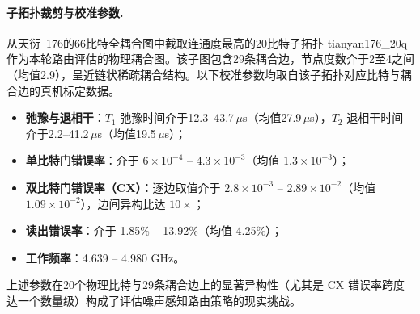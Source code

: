 \paragraph{子拓扑裁剪与校准参数.}
从天衍~176的66比特全耦合图中截取连通度最高的20比特子拓扑 tianyan176\_20q 作为本轮路由评估的物理耦合图。该子图包含29条耦合边，节点度数介于2至4之间（均值2.9），呈近链状稀疏耦合结构。以下校准参数均取自该子拓扑对应比特与耦合边的真机标定数据。
\begin{itemize}
    \item \textbf{弛豫与退相干}：$T_1$ 弛豫时间介于12.3--43.7\,$\mu$s（均值27.9\,$\mu$s），$T_2$ 退相干时间介于2.2--41.2\,$\mu$s（均值19.5\,$\mu$s）；
    \item \textbf{单比特门错误率}：介于 $6\times10^{-4}$ -- $4.3\times10^{-3}$（均值 $1.3\times10^{-3}$）；
    \item \textbf{双比特门错误率（CX）}：逐边取值介于 $2.8\times10^{-3}$ -- $2.89\times10^{-2}$（均值 $1.09\times10^{-2}$），边间异构比达 $10\times$；
    \item \textbf{读出错误率}：介于 1.85\% -- 13.92\%（均值 4.25\%）；
    \item \textbf{工作频率}：4.639 -- 4.980 GHz。
\end{itemize}
上述参数在20个物理比特与29条耦合边上的显著异构性（尤其是 CX 错误率跨度达一个数量级）构成了评估噪声感知路由策略的现实挑战。

